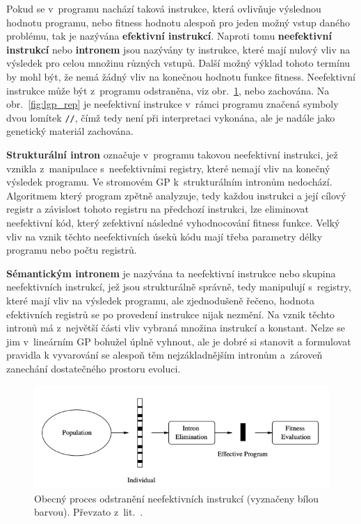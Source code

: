 Pokud se v~programu nachází taková instrukce, která ovlivňuje výslednou hodnotu programu, nebo fitness hodnotu alespoň pro jeden možný vstup daného problému, tak je nazývána \textbf{efektivní instrukcí}. Naproti tomu \textbf{neefektivní instrukcí} nebo \textbf{intronem} jsou nazývány ty instrukce, které mají nulový vliv na výsledek pro celou množinu různých vstupů. Další možný výklad tohoto termínu by mohl být, že nemá žádný vliv na konečnou hodnotu funkce fitness. Neefektivní instrukce může být z~programu odstraněna, viz obr.~\ref{fig:introns-removal}, nebo zachována. Na obr.~\ref{fig:lgp_rep} je neefektivní instrukce v~rámci programu značená symboly dvou lomítek \texttt{//}, čímž tedy není při interpretaci vykonána, ale je nadále jako genetický materiál zachována.

\textbf{Strukturální intron} označuje v~programu takovou neefektivní instrukci, jež vznikla z~manipulace s~neefektivními registry, které nemají vliv na konečný výsledek programu. Ve stromovém GP k~strukturálním intronům nedochází. Algoritmem který program zpětně analyzuje, tedy každou instrukci a její cílový registr a závislost tohoto registru na předchozí instrukci, lze eliminovat neefektivní kód, který zefektivní následné vyhodnocování fitness funkce. Velký vliv na vznik těchto neefektivních úseků kódu mají třeba parametry délky programu nebo počtu registrů. 

\textbf{Sémantickým intronem} je nazývána ta neefektivní instrukce nebo skupina neefektivních instrukcí, jež jsou strukturálně správně, tedy manipulují s~registry, které mají vliv na výsledek programu, ale zjednodušeně řečeno, hodnota efektivních registrů se po provedení instrukce nijak nezmění. Na vznik těchto intronů má z~největší části vliv vybraná množina instrukcí a konstant. Nelze se jim v~lineárním GP bohužel úplně vyhnout, ale je dobré si stanovit a formulovat pravidla k vyvarování se alespoň těm nejzákladnějším intronům a~zároveň zanechání dostatečného prostoru evoluci.

\newpage
\begin{figure}[!h]
    \centering
    \includegraphics[scale=0.6]{obrazky-figures/lgp-introns.png}
    \caption{Obecný proces odstranění neefektivních instrukcí (vyznačeny bílou barvou). Převzato z~lit.~\cite[str. 39]{LGP}.}
    \label{fig:introns-removal}
\end{figure}

